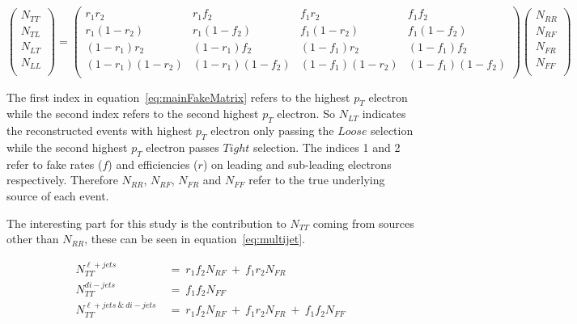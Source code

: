 \begin{equation} \label{eq:mainFakeMatrix}
   \begin{pmatrix}
      N_{TT} \\
      N_{TL} \\
      N_{LT} \\
      N_{LL} \\
   \end{pmatrix}
   =
   \begin{pmatrix}
      r_{1}r_{2} & r_{1}f_{2} & f_{1}r_{2} & f_{1}f_{2} \\
      r_{1}(1-r_{2}) & r_{1}(1-f_{2}) & f_{1}(1-r_{2}) & f_{1}(1-f_{2}) \\
      (1-r_{1})r_{2} & (1-r_{1})f_{2} & (1-f_{1})r_{2} & (1-f_{1})f_{2} \\
      (1-r_{1})(1-r_{2}) & (1-r_{1})(1-f_{2}) & (1-f_{1})(1-r_{2}) & (1-f_{1})(1-f_{2}) \\
   \end{pmatrix}
   \begin{pmatrix}
      N_{RR} \\
      N_{RF} \\
      N_{FR} \\
      N_{FF} \\
   \end{pmatrix}
\end{equation}

The first index in equation~\ref{eq:mainFakeMatrix} refers to the highest $p_{T}$ electron while the second index refers to the second highest $p_{T}$ electron. So $N_{LT}$ indicates the reconstructed events with highest $p_{T}$ electron only passing the $Loose$ selection while the second highest $p_{T}$ electron passes $Tight$ selection. The indices 1 and 2 refer to fake rates ($f$) and efficiencies ($r$) on leading and sub-leading electrons respectively. Therefore $N_{RR}$, $N_{RF}$, $N_{FR}$ and $N_{FF}$ refer to the true underlying source of each event.

The interesting part for this study is the contribution to $N_{TT}$ coming from sources other than $N_{RR}$, these can be seen in equation~\ref{eq:multijet}.

\begin{align} \label{eq:multijet}
   N^{\ell+jets}_{TT}~&=~r_{1}f_{2}N_{RF}~+~f_{1}r_{2}N_{FR} \nonumber \\
   N^{di-jets}_{TT}~&=~f_{1}f_{2}N_{FF} \nonumber \\
   N^{\ell+jets~\&~di-jets}_{TT}~&=~r_{1}f_{2}N_{RF}~+~f_{1}r_{2}N_{FR}~+~f_{1}f_{2}N_{FF} 
\end{align}

